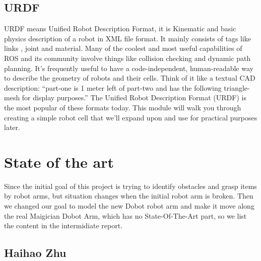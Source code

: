 \documentclass[10pt,twocolumn,letterpaper]{article}
\begin{document}
\subsection{URDF}

URDF means Unified Robot Description Format, it is Kinematic and basic physics description of a robot in XML file format. It mainly consists of tags like links , joint and material.  Many of the coolest and most useful capabilities of ROS and its community involve things like collision checking and dynamic path planning. It’s frequently useful to have a code-independent, human-readable way to describe the geometry of robots and their cells. Think of it like a textual CAD description: “part-one is 1 meter left of part-two and has the following triangle-mesh for display purposes.” The Unified Robot Description Format (URDF) is the most popular of these formats today. This module will walk you through creating a simple robot cell that we’ll expand upon and use for practical purposes later.

\section{State of the art}

Since the initial goal of this project is trying to identify obstacles and grasp items by robot arms, but situation changes when the initial robot arm is broken. Then we changed our goal to model the new Dobot robot arm and make it move along the real Maigician Dobot Arm, which has no State-Of-The-Art part, so we list the content in the intermidiate report.

\subsection{Haihao Zhu}
\end{document}
